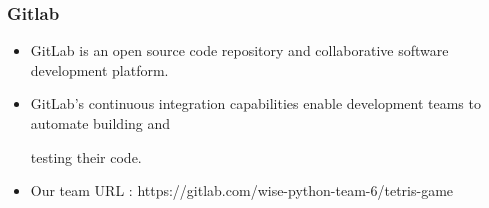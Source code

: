 \documentclass{beamer}
\begin{document}
\begin{frame}

\frametitle{Gitlab}

\begin{itemize}

\item GitLab is an open source code repository and collaborative software development platform.

\item GitLab’s continuous integration capabilities enable development teams to automate building and 

testing their code. 

\item Our team URL : https://gitlab.com/wise-python-team-6/tetris-game

\end{itemize}

\end{frame}
\end{document}
